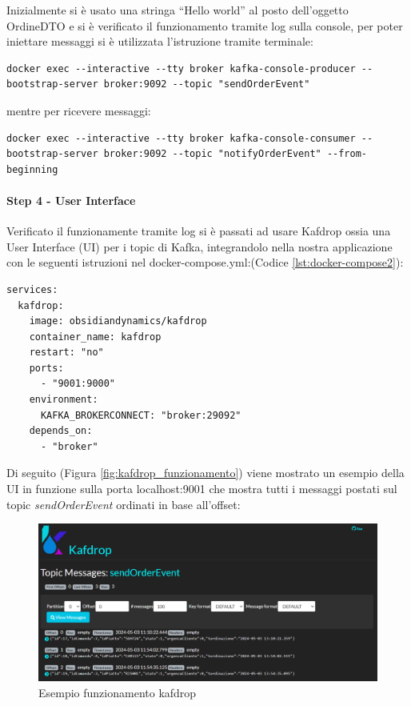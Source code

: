 Inizialmente si è usato una stringa “Hello world” al posto dell’oggetto OrdineDTO e si è verificato il funzionamento tramite log sulla console, per poter iniettare messaggi si è utilizzata l’istruzione tramite terminale:
\begin{lstlisting}[style=terminal, 
    caption={Operazione di post sul topic kafka}, label=lst:postkafka]
docker exec --interactive --tty broker kafka-console-producer --bootstrap-server broker:9092 --topic "sendOrderEvent"
\end{lstlisting}
mentre per ricevere messaggi:
\begin{lstlisting}[style=terminal, 
    caption={Operazione di get sul topic kafka}, label=lst:getkafka]
docker exec --interactive --tty broker kafka-console-consumer --bootstrap-server broker:9092 --topic "notifyOrderEvent" --from-beginning
\end{lstlisting}
\paragraph{Step 4 - User Interface} 
Verificato il funzionamente tramite log si è passati ad usare Kafdrop\cite{kafdrop} ossia una User Interface (UI) per i topic di Kafka, integrandolo nella nostra applicazione con le seguenti istruzioni nel docker-compose.yml:(Codice \vref{lst:docker-compose2}):
\begin{lstlisting}[language=docker-compose, caption={Aggiornamento del docker-compose.yaml perl per Kafdrop}, label=lst:docker-compose2]
services:  
  kafdrop:
    image: obsidiandynamics/kafdrop
    container_name: kafdrop
    restart: "no"
    ports:
      - "9001:9000"
    environment:
      KAFKA_BROKERCONNECT: "broker:29092"
    depends_on:
      - "broker"
\end{lstlisting}
Di seguito (Figura \vref{fig:kafdrop_funzionamento}) viene mostrato un esempio della UI in funzione sulla porta localhost:9001 che mostra tutti i messaggi postati sul topic \textit{sendOrderEvent} ordinati in base all'offset:
\begin{figure}[H]
    \centering
    \includegraphics[width=1\linewidth]{iterazione1//images/kafdrop_esempio_funzionamento.png}
    \caption{Esempio funzionamento kafdrop}
    \label{fig:kafdrop_funzionamento}
\end{figure}
